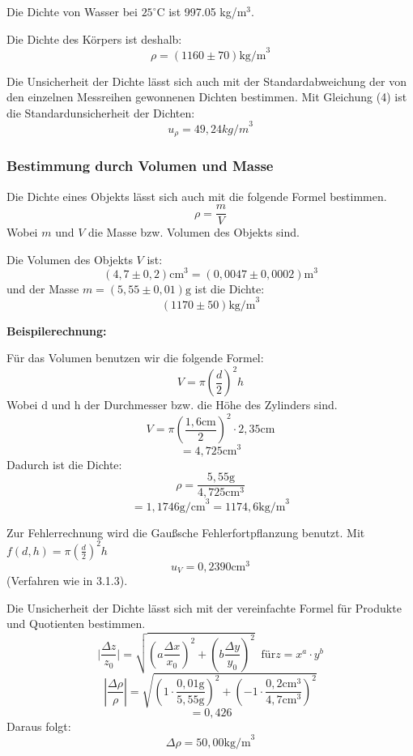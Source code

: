 \documentclass[11pt,a4paper]{article} %
\begin{document}
Die Dichte von Wasser bei $25^\circ$C ist 997.05 kg/m$^3$.

Die Dichte des Körpers ist deshalb:
$$\rho=(1160\pm70) \textrm{kg/m}^3$$

Die Unsicherheit der Dichte lässt sich auch mit der Standardabweichung der von den einzelnen Messreihen gewonnenen Dichten bestimmen.
Mit Gleichung (4) ist die Standardunsicherheit der Dichten:
$$u_\rho=49,24{kg/m}^3$$



\subsubsection{Bestimmung durch Volumen und Masse}
Die Dichte eines Objekts lässt sich auch mit die folgende Formel bestimmen. 
\begin{equation}
\rho=\frac{m}{V}
\end{equation}
Wobei $m$ und $V$ die Masse bzw. Volumen des Objekts sind. 

Die Volumen des Objekts $V$ ist:
$$(4,7\pm0,2) \textrm{cm}^3 = (0,0047 \pm 0,0002) \textrm{m}^3$$
und der Masse $m=(5,55\pm0,01)\textrm{g}$ ist die Dichte:
$$(1170 \pm 50) \textrm{kg/m}^3$$

\begin{tcolorbox}[colback=white]
	\textbf{Beispilerechnung:}
	
Für das Volumen benutzen wir die folgende Formel:
$$V = \pi (\frac{d}{2})^2 h$$
Wobei d und h der Durchmesser bzw. die Höhe des Zylinders sind. 
$$V = \pi (\frac{1,6\textrm{cm}}{2})^2\cdot2,35\textrm{cm}$$
$$ = 4,725 \textrm{cm}^3$$
Dadurch ist die Dichte:
$$\rho=\frac{5,55\textrm{g}}{4,725\textrm{cm}^3}$$
$$=1,1746\textrm{g/cm}^3=1174,6\textrm{kg/m}^3$$

Zur Fehlerrechnung wird die Gaußsche Fehlerfortpflanzung benutzt. Mit $f(d,h)=\pi(\frac{d}{2})^2h$ 
$$u_V = 0,2390 \textrm{cm}^3$$
 (Verfahren wie in 3.1.3).

 Die Unsicherheit der Dichte lässt sich mit der vereinfachte Formel für Produkte und Quotienten bestimmen. 
\begin{equation}
\vert\frac{\Delta z}{z_0}\vert = \sqrt{(a\frac{\Delta x}{x_0})^2+(b\frac{\Delta y}{y_0})^2} \; \; \textrm{für} z=x^a\cdot y^b
\end{equation}
$$|\frac{\Delta\rho}{\rho}|=\sqrt{(1\cdot\frac{0,01\textrm{g}}{5,55\textrm{g}})^2+(-1\cdot\frac{0,2\textrm{cm}^3}{4,7\textrm{cm}^3})^2}$$
$$=0,426$$
Daraus folgt:
$$\Delta\rho=50,00\textrm{kg/m}^3$$
\end{tcolorbox}
\end{document}
